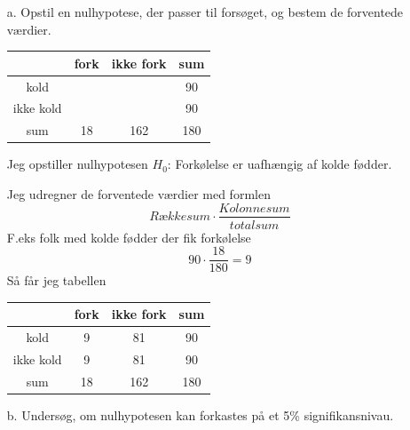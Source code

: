\documentclass[12pt]{article}
\begin{document}
\begin{enumerate}

        \item[a.] Opstil en nulhypotese, der passer til forsøget, og bestem de
                forventede værdier.

                \begin{center}
                        \begin{tabular}{c | c | c | c}
                                & fork & ikke fork & sum \\ \hline
                                kold &&& 90 \\ \hline
                                ikke kold &&& 90 \\ \hline
                                sum & 18 & 162 & 180 \\
                        \end{tabular}
                \end{center}

                Jeg opstiller nulhypotesen $H_0$: Forkølelse er uafhængig af kolde
                fødder.

                Jeg udregner de forventede værdier med formlen
                $$Rækkesum\cdot \frac{Kolonnesum}{totalsum}$$
                F.eks folk med kolde fødder der fik forkølelse
                $$90\cdot \frac{18}{180} = 9$$
                Så får jeg tabellen
                \begin{center}
                        \begin{tabular}{c | c | c | c}
                                & fork & ikke fork & sum \\ \hline
                                kold &9&81& 90 \\ \hline
                                ikke kold &9&81& 90 \\ \hline
                                sum & 18 & 162 & 180 \\
                        \end{tabular}
                \end{center}

        \item[b.] Undersøg, om nulhypotesen kan forkastes på et 5\% signifikansnivau.


\end{enumerate}
\end{document}
